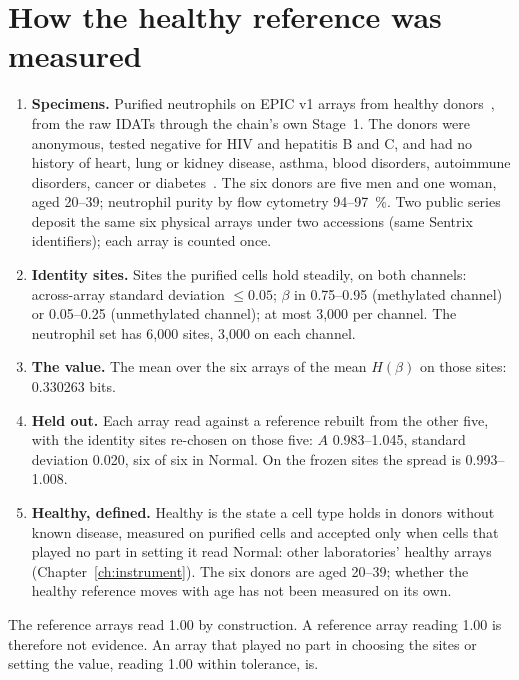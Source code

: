 \section{How the healthy reference was measured}

\begin{enumerate}
\item \textbf{Specimens.} Purified neutrophils on EPIC v1 arrays from healthy donors~\cite{Salas2018,Salas2022}, from the raw
      IDATs through the chain's own Stage~1. The donors were anonymous, tested negative for HIV and hepatitis B and C, and had no history
      of heart, lung or kidney disease, asthma, blood disorders, autoimmune disorders, cancer or diabetes~\cite{Salas2018}. The six
      donors are five men and one woman, aged 20--39; neutrophil purity by flow cytometry 94--97~\%. \observed Two public series deposit the same six physical arrays under two accessions
      (same Sentrix identifiers); each array is counted once.
\item \textbf{Identity sites.} Sites the purified cells hold steadily, on both channels: across-array standard deviation
      $\le0.05$; $\beta$ in 0.75--0.95 (methylated channel) or 0.05--0.25 (unmethylated channel); at most 3,000 per channel.
      The neutrophil set has 6,000 sites, 3,000 on each channel.
\item \textbf{The value.} The mean over the six arrays of the mean $H(\beta)$ on those sites: 0.330263 bits.
\item \textbf{Held out.} Each array read against a reference rebuilt from the other five, with the identity sites re-chosen
      on those five: $A$ 0.983--1.045, standard deviation 0.020, six of six in Normal. On the frozen sites the spread is
      0.993--1.008. \measured
\item \textbf{Healthy, defined.} Healthy is the state a cell type holds in donors without known disease, measured on purified cells and
      accepted only when cells that played no part in setting it read Normal: other laboratories' healthy arrays (Chapter~\ref{ch:instrument}).
      The six donors are aged 20--39; whether the healthy reference moves with age has not been measured on its own. \openprob
\end{enumerate}

\begin{rulebox}
The reference arrays read 1.00 by construction. A reference array reading 1.00 is therefore not evidence. An array that
played no part in choosing the sites or setting the value, reading 1.00 within tolerance, is.
\end{rulebox}


